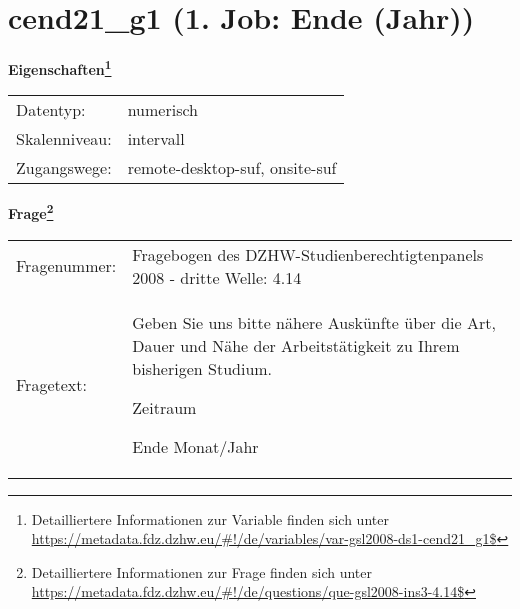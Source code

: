 
    \setcounter{footnote}{0}

    \vspace*{-1.8cm}
	\section{cend21\_g1 (1. Job: Ende (Jahr))}
	\label{section:cend21_g1}



    \vspace*{0.5cm}
    \noindent\textbf{Eigenschaften\footnote{Detailliertere Informationen zur Variable finden sich unter
		\url{https://metadata.fdz.dzhw.eu/\#!/de/variables/var-gsl2008-ds1-cend21_g1$}}}\\
	\begin{tabularx}{\hsize}{@{}lX}
	Datentyp: & numerisch \\
	Skalenniveau: & intervall \\
	Zugangswege: &
	  remote-desktop-suf, 
	  onsite-suf
 \\
    \end{tabularx}



				\vspace*{0.5cm}
                \noindent\textbf{Frage\footnote{Detailliertere Informationen zur Frage finden sich unter
		              \url{https://metadata.fdz.dzhw.eu/\#!/de/questions/que-gsl2008-ins3-4.14$}}}\\
				\begin{tabularx}{\hsize}{@{}lX}
					Fragenummer: &
					  Fragebogen des DZHW-Studienberechtigtenpanels 2008 - dritte Welle:
					  4.14
 \\
					Fragetext: & Geben Sie uns bitte nähere Auskünfte über die Art, Dauer und Nähe der Arbeitstätigkeit zu Ihrem bisherigen Studium.\par  Zeitraum\par  Ende Monat/Jahr \\
				\end{tabularx}





